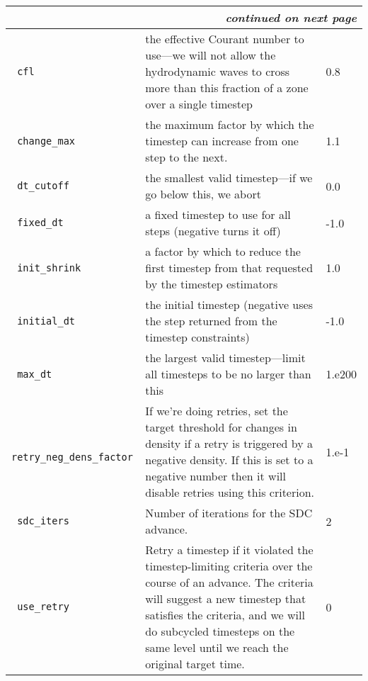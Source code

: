 \begin{landscape}
{\begin{center}
\begin{longtable}{|l|p{5.25in}|l|}
\multicolumn{3}{|r|}{{\em continued on next page}} \\ \hline
\endfoot

\hline 
\endlastfoot


\rowcolor{tableShade}
\verb= cfl = &  the effective Courant number to use---we will not allow the hydrodynamic waves to cross more than this fraction of a zone over a single timestep & 0.8 \\
\verb= change_max = &  the maximum factor by which the timestep can increase from one step to the next. & 1.1 \\
\rowcolor{tableShade}
\verb= dt_cutoff = &  the smallest valid timestep---if we go below this, we abort & 0.0 \\
\verb= fixed_dt = &  a fixed timestep to use for all steps (negative turns it off) & -1.0 \\
\rowcolor{tableShade}
\verb= init_shrink = &  a factor by which to reduce the first timestep from that requested by the timestep estimators & 1.0 \\
\verb= initial_dt = &  the initial timestep (negative uses the step returned from the timestep constraints) & -1.0 \\
\rowcolor{tableShade}
\verb= max_dt = &  the largest valid timestep---limit all timesteps to be no larger than this & 1.e200 \\
\verb= retry_neg_dens_factor = &  If we're doing retries, set the target threshold for changes in density if a retry is triggered by a negative density. If this is set to a negative number then it will disable retries using this criterion. & 1.e-1 \\
\rowcolor{tableShade}
\verb= sdc_iters = &  Number of iterations for the SDC advance. & 2 \\
\verb= use_retry = &  Retry a timestep if it violated the timestep-limiting criteria over the course of an advance. The criteria will suggest a new timestep that satisfies the criteria, and we will do subcycled timesteps on the same level until we reach the original target time. & 0 \\


\end{longtable}
\end{center}

} %


\end{landscape}

%


